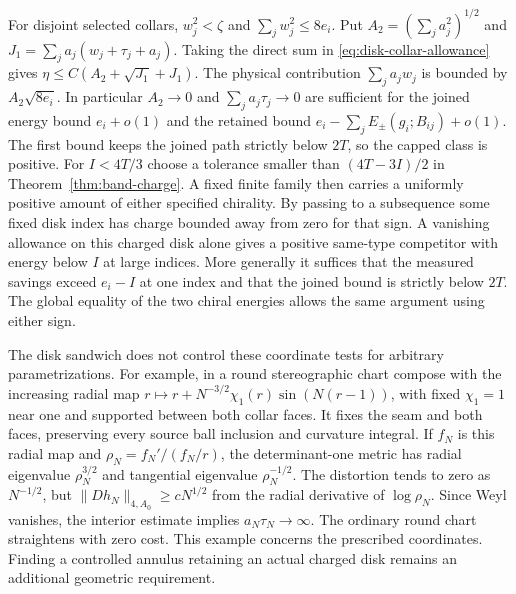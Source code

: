 For disjoint selected collars, \(w_j^2<\zeta\) and
\(\sum_jw_j^2\le8e_i\). Put \(A_2=(\sum_j a_j^2)^{1/2}\)
and \(J_1=\sum_j a_j(w_j+\tau_j+a_j)\). Taking the direct
sum in \eqref{eq:disk-collar-allowance} gives
\(\eta\le C(A_2+\sqrt{J_1}+J_1)\). The physical contribution
\(\sum_j a_jw_j\) is bounded by \(A_2\sqrt{8e_i}\).
In particular \(A_2\to0\) and \(\sum_j a_j\tau_j\to0\)
are sufficient for the joined energy bound \(e_i+o(1)\)
and the retained bound \(e_i-\sum_j E_\pm(g_i;B_{ij})+o(1)\).
The first bound keeps the joined path strictly below \(2T\),
so the capped class is positive. For \(I<4T/3\) choose a tolerance smaller than
\((4T-3I)/2\) in Theorem~\ref{thm:band-charge}.
A fixed finite family then carries a uniformly positive amount
of either specified chirality. By passing to a subsequence some
fixed disk index has charge bounded away from zero for that sign.
A vanishing allowance on this charged disk alone gives a positive
same-type competitor with energy below \(I\) at large indices.
More generally it suffices that the measured savings exceed
\(e_i-I\) at one index and that the joined bound is strictly
below \(2T\). The global equality of the two chiral energies
allows the same argument using either sign.

The disk sandwich does not control these coordinate tests
for arbitrary parametrizations. For example, in a round
stereographic chart compose with the increasing radial map
\(r\mapsto r+N^{-3/2}\chi_1(r)\sin(N(r-1))\), with fixed
\(\chi_1=1\) near one and supported between both collar
faces. It fixes the seam and both faces, preserving every
source ball inclusion and curvature integral. If \(f_N\)
is this radial map and \(\rho_N=f_N'/(f_N/r)\), the
determinant-one metric has radial eigenvalue
\(\rho_N^{3/2}\) and tangential eigenvalue \(\rho_N^{-1/2}\).
The distortion tends to zero as \(N^{-1/2}\), but
\(\|Dh_N\|_{4,A_0}\ge cN^{1/2}\) from the radial derivative
of \(\log\rho_N\). Since Weyl vanishes, the interior estimate
implies \(a_N\tau_N\to\infty\). The ordinary round chart
straightens with zero cost. This example concerns the
prescribed coordinates. Finding a controlled annulus
retaining an actual charged disk remains an additional
geometric requirement.
